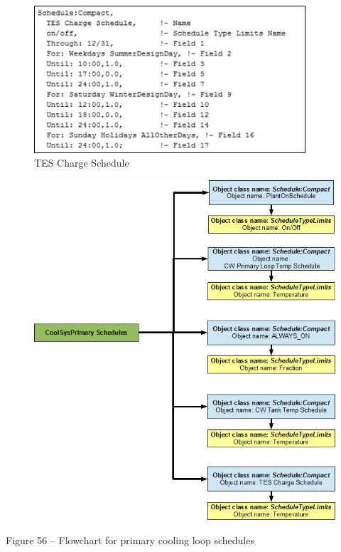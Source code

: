 \begin{figure}[hbtp] %
\centering
\includegraphics[width=0.9\textwidth, height=0.9\textheight, keepaspectratio=true]{media/image055.png}
\caption{TES Charge Schedule \protect \label{fig:tes-charge-schedule}}
\end{figure}

\begin{figure}[htbp]
\centering
\includegraphics{media/image056.png}
\caption{}
\end{figure}

Figure 56 -- Flowchart for primary cooling loop schedules

